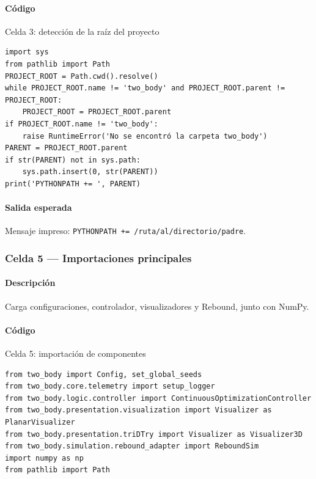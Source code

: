 \paragraph{Código}
\begin{listing}[H]
\caption{Celda 3: detección de la raíz del proyecto}
\begin{adjustbox}{max width=\textwidth}
\begin{minipage}{\textwidth}
\begin{verbatim}
import sys
from pathlib import Path
PROJECT_ROOT = Path.cwd().resolve()
while PROJECT_ROOT.name != 'two_body' and PROJECT_ROOT.parent != PROJECT_ROOT:
    PROJECT_ROOT = PROJECT_ROOT.parent
if PROJECT_ROOT.name != 'two_body':
    raise RuntimeError('No se encontró la carpeta two_body')
PARENT = PROJECT_ROOT.parent
if str(PARENT) not in sys.path:
    sys.path.insert(0, str(PARENT))
print('PYTHONPATH += ', PARENT)
\end{verbatim}
\end{minipage}
\end{adjustbox}
\end{listing}
\paragraph{Salida esperada} Mensaje impreso: \texttt{PYTHONPATH += /ruta/al/directorio/padre}.

\subsubsection*{Celda 5 — Importaciones principales}
\paragraph{Descripción} Carga configuraciones, controlador, visualizadores y Rebound, junto con NumPy.
\paragraph{Código}
\begin{listing}[H]
\caption{Celda 5: importación de componentes}
\begin{adjustbox}{max width=\textwidth}
\begin{minipage}{\textwidth}
\begin{verbatim}
from two_body import Config, set_global_seeds
from two_body.core.telemetry import setup_logger
from two_body.logic.controller import ContinuousOptimizationController
from two_body.presentation.visualization import Visualizer as PlanarVisualizer
from two_body.presentation.triDTry import Visualizer as Visualizer3D
from two_body.simulation.rebound_adapter import ReboundSim
import numpy as np
from pathlib import Path
\end{verbatim}
\end{minipage}
\end{adjustbox}
\end{listing}

